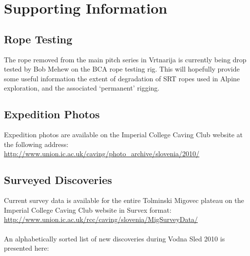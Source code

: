 \documentclass[english,a4]{article}
\begin{document}
\section{Supporting Information}

\subsection{Rope Testing}

The rope removed from the main pitch series in Vrtnarija is currently being
drop tested by Bob Mehew on the BCA rope testing rig. This will hopefully
provide some useful information the extent of degradation of SRT ropes used in
Alpine exploration, and the associated `permanent' rigging.

\subsection{Expedition Photos}

Expedition photos are available on the Imperial College Caving Club website at the following address:\\

\url{http://www.union.ic.ac.uk/caving/photo\_archive/slovenia/2010/}\\

\subsection{Surveyed Discoveries}

Current survey data is available for the entire Tolminski Migovec plateau on the Imperial College Caving Club website in Survex format:\\

\url{http://www.union.ic.ac.uk/rcc/caving/slovenia/MigSurveyData/}\\
\\
An alphabetically sorted list of new discoveries during Vodna Sled 2010 is presented here:\\
\end{document}
